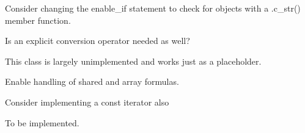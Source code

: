 
\begin{DoxyRefList}
\item[Member \mbox{\hyperlink{class_open_x_l_s_x_1_1_x_l_cell_value_a63da90fb2a5972799ece07f7b71f6c3b}{Open\+XLSX\+::XLCell\+Value\+::XLCell\+Value}} (T value)]\label{todo__todo000001}%
%
Consider changing the enable\+\_\+if statement to check for objects with a .c\+\_\+str() member function.  
\item[Member \mbox{\hyperlink{class_open_x_l_s_x_1_1_x_l_cell_value_proxy_ae176c174cf8b38f7238cf3d99acb636b}{Open\+XLSX\+::XLCell\+Value\+Proxy\+::get}} () const]\label{todo__todo000002}%
%
Is an explicit conversion operator needed as well?  
\item[Class \mbox{\hyperlink{class_open_x_l_s_x_1_1_x_l_chartsheet}{Open\+XLSX\+::XLChartsheet}} ]\label{todo__todo000005}%
%
This class is largely unimplemented and works just as a placeholder.  
\item[Class \mbox{\hyperlink{class_open_x_l_s_x_1_1_x_l_formula}{Open\+XLSX\+::XLFormula}} ]\label{todo__todo000003}%
%
Enable handling of shared and array formulas.  
\item[Class \mbox{\hyperlink{class_open_x_l_s_x_1_1_x_l_row_data_iterator}{Open\+XLSX\+::XLRow\+Data\+Iterator}} ]\label{todo__todo000004}%
%
Consider implementing a const iterator also  
\item[Member \mbox{\hyperlink{class_open_x_l_s_x_1_1_x_l_sheet_base_a1907f6dd2917ceb13525e05ebab0e0ad}{Open\+XLSX\+::XLSheet\+Base\texorpdfstring{$<$}{<} T, \texorpdfstring{$>$}{>}\+::color}} () const]\label{todo__todo000006}%
%
To be implemented. 
\end{DoxyRefList}
